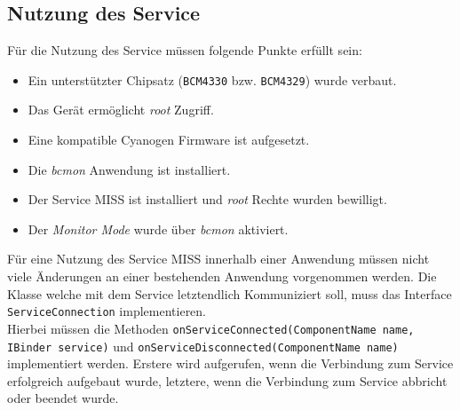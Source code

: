 \documentclass[]{report}
\begin{document}
\subsection{Nutzung des Service}\label{lab:usage}
Für die Nutzung des Service müssen folgende Punkte erfüllt sein:
\begin{itemize}
\item Ein unterstützter Chipsatz (\texttt{BCM4330} bzw. \texttt{BCM4329}) wurde verbaut.
\item Das Gerät ermöglicht \textit{root} Zugriff.
\item Eine kompatible Cyanogen Firmware ist aufgesetzt.
\item Die \textit{bcmon} Anwendung ist installiert.
\item Der Service MISS ist installiert und \textit{root} Rechte wurden bewilligt.
\item Der \textit{Monitor Mode} wurde über \textit{bcmon} aktiviert.
\end{itemize}
Für eine Nutzung des Service MISS innerhalb einer Anwendung müssen nicht viele Änderungen an einer bestehenden Anwendung vorgenommen werden. Die Klasse welche mit dem Service letztendlich Kommuniziert soll, muss das Interface \texttt{ServiceConnection} implementieren.\\
Hierbei müssen die Methoden \texttt{onServiceConnected(ComponentName name, IBinder service)} und \texttt{onServiceDisconnected(ComponentName name)} implementiert werden. Erstere wird aufgerufen, wenn die Verbindung zum Service erfolgreich aufgebaut wurde, letztere, wenn die Verbindung zum Service abbricht oder beendet wurde. \\
\end{document}
